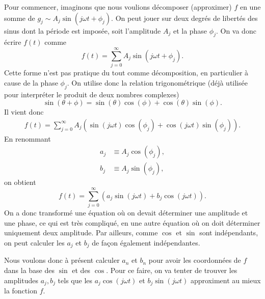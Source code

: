 \documentclass[a4paper,12pt]{book}
\begin{document}
Pour commencer, imaginons que nous voulions décomposer (approximer) $f$ en une somme de $g_j\sim A_j\sin(j\omega t+\phi_j)$.
On peut jouer sur deux degrés de libertés des sinus dont la période est imposée, soit l'amplitude $A_j$ et la phase $\phi_j$.
On va donc écrire $f(t)$ comme
\begin{equation}
 f(t)=\sum_{j=0}^\infty A_j\sin(j\omega t+\phi_j).\label{eq_sin_phase_ampl}
\end{equation}
Cette forme n'est pas pratique du tout comme décomposition, en particulier à cause de la phase $\phi_j$. On utilise donc la relation trigonométrique
(déjà utilisée pour interpréter le produit de deux nombres complexes)
\begin{equation*}
 \sin(\theta+\phi)=\sin(\theta)\cos(\phi)+\cos(\theta)\sin(\phi).
\end{equation*}
Il vient donc
\begin{align}
 f(t)=\sum_{j=0}^\infty A_j\left(\sin(j\omega t)\cos(\phi_j)+\cos(j\omega t)\sin(\phi_j)\right).
\end{align}
En renommant 
\begin{align}
a_j&\equiv A_j\cos(\phi_j),\\
b_j&\equiv A_j\sin(\phi_j),
\end{align}
on obtient
\begin{equation}
 f(t)=\sum_{j=0}^\infty \left(a_j\sin(j\omega t)+b_j\cos(j\omega t)\right). \label{eq_decomp_sincos}
\end{equation}
On a donc transformé une équation où on devait déterminer une amplitude et une phase, ce qui est très compliqué, en une autre
équation où on doit déterminer uniquement deux amplitude. Par ailleurs, comme $\cos$ et $\sin$ sont indépendants,
on peut calculer les $a_j$ et $b_j$ de façon également indépendantes.

Nous voulons donc à présent calculer $a_n$ et $b_n$ pour avoir les coordonnées de $f$ dans la base 
des $\sin$ et des $\cos$. Pour ce faire, on va tenter de trouver les amplitudes $a_j,b_j$ tels
que les $a_j\cos(j\omega t)$ et $b_j\sin(j\omega t)$ approximent au mieux la fonction $f$.
\end{document}
